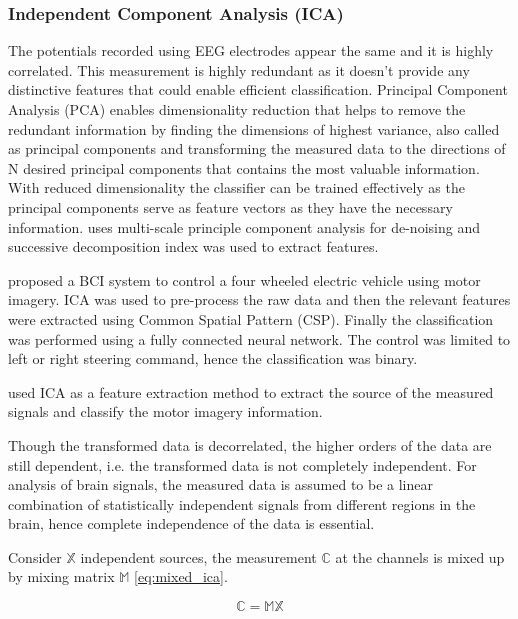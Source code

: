 \subsubsection{Independent Component Analysis (ICA)}
The potentials recorded using EEG electrodes appear the same and it is highly correlated. This measurement is highly redundant as it doesn't provide any distinctive features that could enable efficient classification. Principal Component Analysis (PCA)  enables dimensionality reduction that helps to remove the redundant information by finding the dimensions of highest variance, also called as principal components and transforming the measured data to the directions of N desired principal components that contains the most valuable information. With reduced dimensionality the classifier can be trained effectively as the principal components serve as feature vectors as they have the necessary information. \cite{2020_MI_PCA} uses multi-scale principle component analysis for de-noising and successive decomposition index was used to extract features.

\cite{2017_MotionCOntrol_MI_ICA} proposed a BCI system to control a four wheeled electric vehicle using motor imagery. ICA was used to pre-process the raw data and then the relevant features were extracted using Common Spatial Pattern (CSP). Finally the classification was performed using a fully connected neural network. The control was limited to left or right steering command, hence the classification was binary.

\cite{2021_Feat_MI_TF_ICA_SVM} used ICA as a feature extraction method to extract the source of the measured signals and classify the motor imagery information.

Though the transformed data is decorrelated, the higher orders of the data are still dependent, i.e. the transformed data is not completely independent. For analysis of brain signals, the measured data is assumed to be a linear combination of statistically independent signals from different regions in the brain, hence complete independence of the data is essential.

Consider $\mathbb{X}$ independent sources, the measurement $\mathbb{C}$ at the channels is mixed up by mixing matrix $\mathbb{M}$ \ref{eq:mixed_ica}.

\begin{equation} \label{eq:mixed_ica}
    \mathbb{C} = \mathbb{MX} 
\end{equation}


